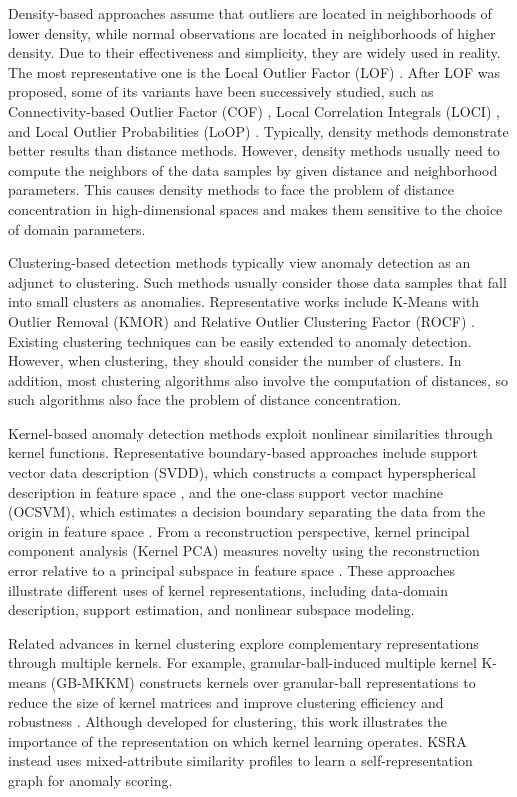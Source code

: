 \documentclass[ASNA,twocolumn]{USG} %
\begin{document}
Density-based approaches assume that outliers are located in neighborhoods of lower density, while normal observations are located in neighborhoods of higher density. Due to their effectiveness and simplicity, they are widely used in reality. The most representative one is the Local Outlier Factor (LOF) \cite{breunig2000lof}. After LOF was proposed, some of its variants have been successively studied, such as Connectivity-based Outlier Factor (COF) \cite{tang2002enhancing}, Local Correlation Integrals (LOCI) \cite{papadimitriou2003loci}, and Local Outlier Probabilities (LoOP) \cite{kriegel2009loop}. 
Typically, density methods demonstrate better results than distance methods. However, density methods usually need to compute the neighbors of the data samples by given distance and neighborhood parameters. This causes density methods to face the problem of distance concentration in high-dimensional spaces and makes them sensitive to the choice of domain parameters.

Clustering-based detection methods typically view anomaly detection as an adjunct to clustering. Such methods usually consider those data samples that fall into small clusters as anomalies. Representative works include K-Means with Outlier Removal (KMOR) \cite{gan2017k} and Relative Outlier Clustering Factor (ROCF) \cite{huang2017novel}. Existing clustering techniques can be easily extended to anomaly detection. However, when clustering, they should consider the number of clusters. In addition, most clustering algorithms also involve the computation of distances, so such algorithms also face the problem of distance concentration.

Kernel-based anomaly detection methods exploit nonlinear similarities through kernel functions. Representative boundary-based approaches include support vector data description (SVDD), which constructs a compact hyperspherical description in feature space \cite{tax2004support}, and the one-class support vector machine (OCSVM), which estimates a decision boundary separating the data from the origin in feature space \cite{scholkopf2001estimating}. From a reconstruction perspective, kernel principal component analysis (Kernel PCA) measures novelty using the reconstruction error relative to a principal subspace in feature space \cite{hoffmann2007kernel}. These approaches illustrate different uses of kernel representations, including data-domain description, support estimation, and nonlinear subspace modeling.

Related advances in kernel clustering explore complementary representations through multiple kernels. For example, granular-ball-induced multiple kernel K-means (GB-MKKM) constructs kernels over granular-ball representations to reduce the size of kernel matrices and improve clustering efficiency and robustness \cite{xia2025granular}. Although developed for clustering, this work illustrates the importance of the representation on which kernel learning operates. KSRA instead uses mixed-attribute similarity profiles to learn a self-representation graph for anomaly scoring.
\end{document}
